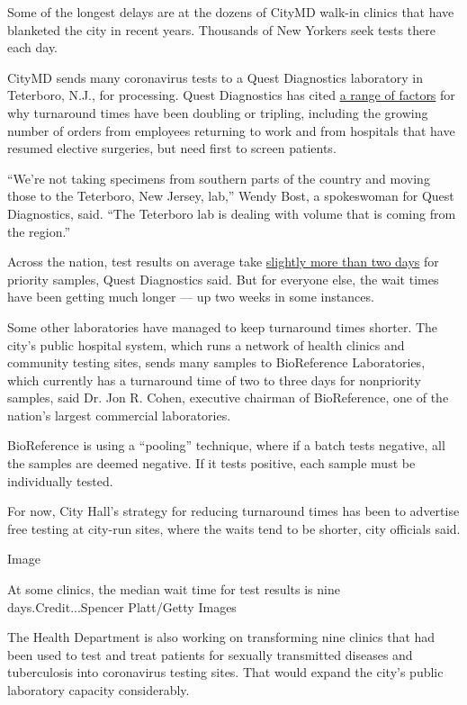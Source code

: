 Some of the longest delays are at the dozens of CityMD walk-in clinics
that have blanketed the city in recent years. Thousands of New Yorkers
seek tests there each day.

CityMD sends many coronavirus tests to a Quest Diagnostics laboratory in
Teterboro, N.J., for processing. Quest Diagnostics has cited
\href{https://newsroom.questdiagnostics.com/COVIDTestingUpdates}{a range
of factors} for why turnaround times have been doubling or tripling,
including the growing number of orders from employees returning to work
and from hospitals that have resumed elective surgeries, but need first
to screen patients.

``We're not taking specimens from southern parts of the country and
moving those to the Teterboro, New Jersey, lab,'' Wendy Bost, a
spokeswoman for Quest Diagnostics, said. ``The Teterboro lab is dealing
with volume that is coming from the region.''

Across the nation, test results on average take
\href{https://newsroom.questdiagnostics.com/COVIDTestingUpdates}{slightly
more than two days} for priority samples, Quest Diagnostics said. But
for everyone else, the wait times have been getting much longer --- up
two weeks in some instances.

Some other laboratories have managed to keep turnaround times shorter.
The city's public hospital system, which runs a network of health
clinics and community testing sites, sends many samples to BioReference
Laboratories, which currently has a turnaround time of two to three days
for nonpriority samples, said Dr. Jon R. Cohen, executive chairman of
BioReference, one of the nation's largest commercial laboratories.

BioReference is using a ``pooling'' technique, where if a batch tests
negative, all the samples are deemed negative. If it tests positive,
each sample must be individually tested.

For now, City Hall's strategy for reducing turnaround times has been to
advertise free testing at city-run sites, where the waits tend to be
shorter, city officials said.

Image

At some clinics, the median wait time for test results is nine
days.Credit...Spencer Platt/Getty Images

The Health Department is also working on transforming nine clinics that
had been used to test and treat patients for sexually transmitted
diseases and tuberculosis into coronavirus testing sites. That would
expand the city's public laboratory capacity considerably.

